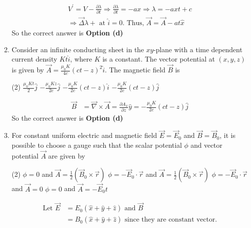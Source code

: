 \begin{enumerate}
\begin{tasks}
	\end{tasks}
\begin{answer}
	\begin{align*}
	V^{\prime}=V-\frac{\partial \lambda}{\partial t} \Rightarrow \frac{\partial \lambda}{\partial t}=-a x \Rightarrow \lambda=-a x t+c\\
	\Rightarrow \vec{\Delta} \lambda+\text{ at }\hat{i}=0 .\text{ Thus, }\vec{A}=\vec{A}-a t \hat{x}
	\end{align*}
	So the correct answer is \textbf{Option (d)}
\end{answer}
	\item  Consider an infinite conducting sheet in the $x y$-plane with a time dependent current density $K t \hat{i}$, where $K$ is a constant. The vector potential at $(x, y, z)$ is given by $\vec{A}=\frac{\mu_{0} K}{4 c}(c t-z)^{2} \hat{i}$. The magnetic field $\vec{B}$ is
	{}
	\begin{tasks}(2)
		\task[\textbf{a.}]$\frac{\mu_{0} K t}{2} \hat{j}$
		\task[\textbf{b.}]$-\frac{\mu_{0} K z}{2 c} \hat{j}$
		\task[\textbf{c.}] $-\frac{\mu_{0} K}{2 c}(c t-z) \hat{i}$
		\task[\textbf{d.}]  $-\frac{\mu_{0} K}{2 c}(c t-z) \hat{j}$
	\end{tasks}
\begin{answer}
	\begin{align*}
	\vec{B}&=\vec{\nabla} \times \vec{A}=\frac{\partial A_{x}}{\partial z} \hat{y}=-\frac{\mu_{0} K}{2 c}(c t-z) \hat{j}
	\end{align*}
	So the correct answer is \textbf{Option (d)}
\end{answer}
	\item  For constant uniform electric and magnetic field $\vec{E}=\vec{E}_{0}$ and $\vec{B}=\vec{B}_{0}$, it is possible to choose a gauge such that the scalar potential $\phi$ and vector potential $\vec{A}$ are given by 
	{}
	\begin{tasks}(2)
		\task[\textbf{a.}]$\phi=0$ and $\vec{A}=\frac{1}{2}\left(\vec{B}_{0} \times \vec{r}\right)$
		\task[\textbf{b.}]$\phi=-\vec{E}_{0} \cdot \vec{r}$ and $\vec{A}=\frac{1}{2}\left(\vec{B}_{0} \times \vec{r}\right)$
		\task[\textbf{c.}]$\phi=-\vec{E}_{0} \cdot \vec{r}$ and $\vec{A}=0$
		\task[\textbf{d.}] $\phi=0$ and $\vec{A}=-\vec{E}_{0} t$
	\end{tasks}
\begin{answer}
	\begin{align*}
	\text{Let }\vec{E}&=E_{0}(\hat{x}+\hat{y}+\hat{z})\text{ and } \vec{B}\\&=B_{0}(\hat{x}+\hat{y}+\hat{z})\text{ since they are constant vector.}\\

\end{align*}
\end{answer}
\end{enumerate}
